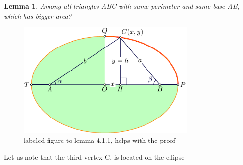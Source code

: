 \documentclass[a4paper]{book}
\newtheorem{lemma}[theorem]{Lemma}%
\numberwithin{theorem}{section}%
\begin{document}
\begin{lemma} 
    Among all triangles ABC with same perimeter and same base AB, which has bigger area?
\end{lemma}
\begin{figure}[hbt!]
    \begin{center}   
        \includegraphics[width=88mm]{lemma3}
        \caption{labeled figure to lemma 4.1.1, helps with the proof}
    \end{center}
\end{figure}\leavevmode
Let us note that the third vertex $\mathrm{C}$, is located on the ellipse
\end{document}
